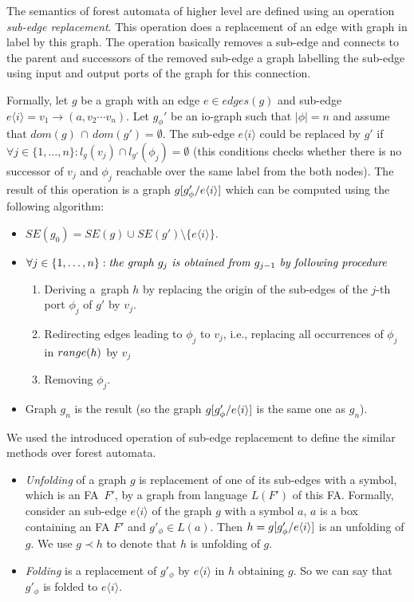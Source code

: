 \documentclass[a4paper, 12pt]{article}
\begin{document}
The semantics of forest automata of higher level are defined
using an operation \emph{sub-edge replacement}.
This operation does a replacement of an edge with graph in label
by this graph.
The operation basically removes a sub-edge and connects
to the parent and successors of the removed sub-edge a graph
labelling the sub-edge using input and output ports
of the graph for this connection.

Formally, let $g$ be a graph with an edge $e \in edges(g)$ and sub-edge $e\langle i\rangle = v_1 \rightarrow (a,v_2 \cdots v_n)$.
Let $g_{\phi}'$ be an io-graph such that $|\phi| = n$ and assume that ${dom(g)}\, \cap\, {dom(g')} = \emptyset$.
The sub-edge $e\langle i\rangle$ could be replaced by $g'$ if $\forall j \in \{1,\ldots,n\}: l_{g}(v_j) \cap
l_{g'}(\phi_j) = \emptyset$
(this conditions checks whether there is no successor of $v_j$ and $\phi_j$ reachable over the same
label from the both nodes).
The result of this operation is a graph $g[g'_\phi/e\langle i\rangle]$
which can be computed using the following algorithm:
\begin{itemize}
	\item $SE(g_0) = SE(g) \cup SE(g') \setminus \{e\langle i\rangle\}$.
	\item $\forall j \in \{1, \ldots, n\}: \emph{the graph } g_j \emph{ is obtained from } g_{j-1} \emph{ by following procedure }$
		\begin{enumerate}
			\item Deriving a~graph $h$ by replacing the origin of the sub-edges of the $j$-th port $\phi_j$ of $g'$ by $v_j$.
			\item Redirecting edges leading to $\phi_{j}$ to $v_j$, i.e., replacing all occurrences of $\phi_j$ in $range(h)$ by $v_j$
			\item Removing $\phi_j$. 
		\end{enumerate}
	\item Graph $g_n$ is the result (so the graph $g[g'_\phi/e\langle i\rangle]$ is the same one as $g_n$).
\end{itemize}

We used the introduced operation of sub-edge replacement to define
the similar methods over forest automata.
\begin{itemize}
	\item \emph{Unfolding} of a graph $g$ is replacement of one of its sub-edges with a symbol, which is
		an FA~$F'$, by a graph from language $L(F')$ of this FA.
		Formally, consider an sub-edge $e\langle i \rangle$ of the graph $g$ with a symbol $a$,
		$a$ is a box containing an FA $F'$ and $g'_\phi \in L(a)$.
		Then $h = g [g'_\phi/e\langle i \rangle]$ is an unfolding of $g$.
		We use $g \prec h$ to denote that $h$ is unfolding of $g$.
	\item \emph{Folding} is a replacement of $g'_\phi$ by $e \langle i \rangle$ in $h$ obtaining $g$.
		So we can say that $g'_\phi$ is folded to $e \langle i \rangle$. 
\end{itemize}
\end{document}
